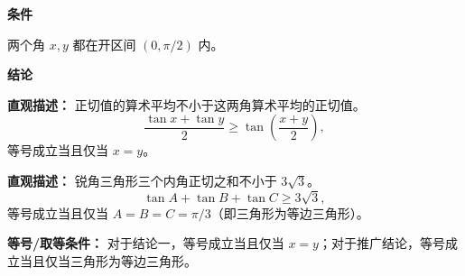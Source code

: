 \begin{statementbox}

\textbf{\textcolor{CStatement}{条件}}
\begin{description}[style=nextline, leftmargin=2.8em, labelsep=0.5em, itemsep=0.35em]
    \item[\textbf{\textcolor{CStatement}{条件 1（角范围）：}}] 两个角 $x, y$ 都在开区间 $(0, \pi/2)$ 内。
\end{description}

\textbf{\textcolor{CStatement}{结论}}
\begin{description}[style=nextline, leftmargin=2.8em, labelsep=0.5em, itemsep=0.45em]
    \item[\textbf{\textcolor{CStatement}{结论一（正切凸性不等式）：}}]
    \textbf{\textcolor{CStatement}{直观描述：}} 正切值的算术平均不小于这两角算术平均的正切值。
    \[
    \frac{\tan x + \tan y}{2} \geq \tan\left(\frac{x+y}{2}\right),
    \]
    等号成立当且仅当 $x = y$。

    \item[\textbf{\textcolor{CStatement}{推广结论（三角形正切和下界）：}}]
    \textbf{\textcolor{CStatement}{直观描述：}} 锐角三角形三个内角正切之和不小于 $3\sqrt{3}$。
    \[
    \tan A + \tan B + \tan C \geq 3\sqrt{3},
    \]
    等号成立当且仅当 $A = B = C = \pi/3$（即三角形为等边三角形）。
\end{description}

\textbf{\textcolor{CStatement}{等号/取等条件：}} 对于结论一，等号成立当且仅当 $x = y$；对于推广结论，等号成立当且仅当三角形为等边三角形。

\end{statementbox}
